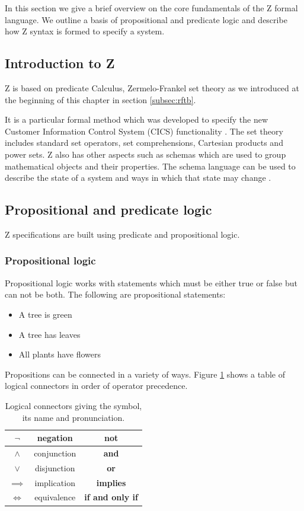 In this section we give a brief overview on the core fundamentals of the Z formal language. We outline a basis of propositional and predicate logic and describe how Z syntax is formed to specify a system.

\subsection{Introduction to Z}


Z is based on predicate Calculus, Zermelo-Frankel set theory as we introduced at the beginning of this chapter in section \ref{subsec:rftb}.

It is a particular formal method which was developed to specify the new Customer Information Control System (CICS) functionality \cite{cics}. The set theory includes standard set operators, set comprehensions, Cartesian products and power sets. Z also has other aspects such as schemas which are used to group mathematical objects and their properties. The schema language can be used to describe the state of a system and ways in which that state may change \cite{Woodcock:1996:UZS:235337}.

\subsection{Propositional and predicate logic}

Z specifications are built using predicate and propositional logic.

\subsubsection{Propositional logic}

Propositional logic works with statements which must be either true or false but can not be both. The following are propositional statements:
\begin{itemize}
\item A tree is green

\item A tree has leaves

\item All plants have flowers
\end{itemize}

Propositions can be connected in a variety of ways. Figure \ref{tab:logcon} shows a table of logical connectors in order of operator precedence.

\begin{table}[H]
\centering
\begin{tabular}{| c | c | c |}
\hline
$\neg$ & negation & \textbf{not} \\
\hline
$\land$ & conjunction & \textbf{and} \\
\hline
$\lor$ & disjunction & \textbf{or} \\
\hline
$\implies$ & implication & \textbf{implies} \\
\hline
$\Leftrightarrow$ & equivalence & \textbf{if and only if} \\
\hline
\end{tabular}
\caption{Logical connectors giving the symbol, its name and pronunciation. \label{tab:logcon}}
\end{table}

